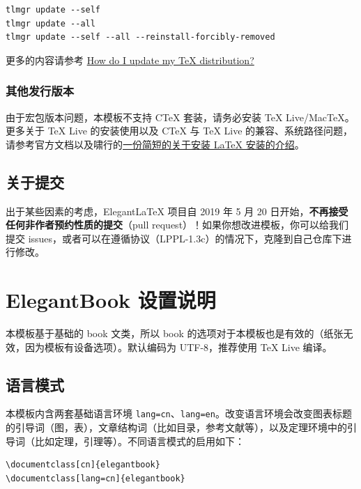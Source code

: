 \documentclass[lang=cn,10pt,cite=super]{elegantbook}
\begin{document}
\begin{lstlisting}
tlmgr update --self 
tlmgr update --all
tlmgr update --self --all --reinstall-forcibly-removed
\end{lstlisting}

更多的内容请参考 \href{https://tex.stackexchange.com/questions/55437/how-do-i-update-my-tex-distribution}{How do I update my \TeX{} distribution?}

\subsection{其他发行版本}

由于宏包版本问题，本模板不支持 C\TeX{} 套装，请务必安装 TeX Live/Mac\TeX{}。更多关于 \TeX{} Live 的安装使用以及 C\TeX{} 与 \TeX{} Live 的兼容、系统路径问题，请参考官方文档以及啸行的\href{https://github.com/OsbertWang/install-latex-guide-zh-cn/releases/}{一份简短的关于安装 \LaTeX{} 安装的介绍}。


\section{关于提交}

出于某些因素的考虑，Elegant\LaTeX{} 项目自 2019 年 5 月 20 日开始，\textbf{不再接受任何非作者预约性质的提交}（pull request）！如果你想改进模板，你可以给我们提交 issues，或者可以在遵循协议（LPPL-1.3c）的情况下，克隆到自己仓库下进行修改。


\chapter{ElegantBook 设置说明}

本模板基于基础的 book 文类，所以 book 的选项对于本模板也是有效的（纸张无效，因为模板有设备选项）。默认编码为 UTF-8，推荐使用 \TeX{} Live 编译。

\section{语言模式}
本模板内含两套基础语言环境 \lstinline{lang=cn}、\lstinline{lang=en}。改变语言环境会改变图表标题的引导词（图，表），文章结构词（比如目录，参考文献等），以及定理环境中的引导词（比如定理，引理等）。不同语言模式的启用如下：
\begin{lstlisting}
\documentclass[cn]{elegantbook} 
\documentclass[lang=cn]{elegantbook}
\end{lstlisting}
\end{document}
